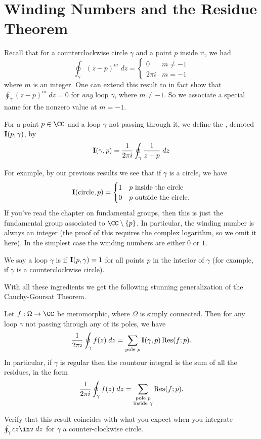 \section{Winding Numbers and the Residue Theorem}
Recall that for a counterclockwise circle $\gamma$ and a point $p$ inside it, we had
\[
	\oint_{\gamma} (z-p)^m \; dz =
	\begin{cases}
		0 & m \neq -1 \\
		2\pi i & m = -1
	\end{cases}
\]
where $m$ is an integer.
One can extend this result to in fact show that $\oint_\gamma (z-p)^m \; dz = 0$
for \emph{any} loop $\gamma$, where $m \neq -1$.
So we associate a special name for the nonzero value at $m=-1$.
\begin{definition}
	For a point $p \in \CC$ and a loop $\gamma$ not passing through it,
	we define the , denoted $\operatorname{\mathbf I}(p, \gamma)$, by
	\[
		\operatorname{\mathbf I}(\gamma, p) = \frac{1}{2\pi i} \oint_{\gamma} \frac{1}{z-p} \; dz
	\]
\end{definition}
For example, by our previous results we see that if $\gamma$ is a circle, we have
\[
	\operatorname{\mathbf I}(\text{circle}, p)
	=
	\begin{cases}
		1 & \text{$p$ inside the circle} \\
		0 & \text{$p$ outside the circle}.
	\end{cases}
\]
If you've read the chapter on fundamental groups, then this is just the fundamental group
associated to $\CC \setminus \{p\}$.
In particular, the winding number is always an integer (the proof of this requires the complex logarithm,
so we omit it here).
In the simplest case the winding numbers are either $0$ or $1$.
\begin{definition}
	We say a loop $\gamma$ is  if $\operatorname{\mathbf I}(p, \gamma) = 1$
	for all points $p$ in the interior of $\gamma$ (for example,
	if $\gamma$ is a counterclockwise circle).
\end{definition}

With all these ingredients we get the following stunning generalization of the Cauchy-Goursat Theorem.
\begin{theorem}
	Let $f : \Omega \to \CC$ be meromorphic, where $\Omega$ is simply connected.
	Then for any loop $\gamma$ not passing through any of its poles, we have
	\[
		\frac{1}{2\pi i} \oint_{\gamma} f(z) \; dz
		= \sum_{\text{pole $p$}} \operatorname{\mathbf I}(\gamma, p) \operatorname{Res}(f; p).
	\]
	In particular, if $\gamma$ is regular then the countour integral is the sum of all the residues, in the form
	\[
		\frac{1}{2\pi i} \oint_{\gamma} f(z) \; dz
		= \sum_{\substack{\text{pole $p$} \\ \text{inside $\gamma$}}}  \operatorname{Res}(f; p).
	\]
\end{theorem}
\begin{ques}
	Verify that this result coincides
	with what you expect when you integrate $\oint_\gamma cz\inv \; dz$
	for $\gamma$ a counter-clockwise circle.
\end{ques}

